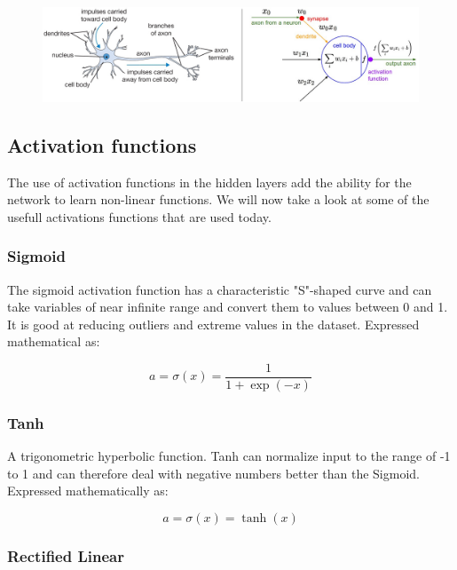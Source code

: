 \begin{figure}[H]
	\centering
	\includegraphics[width=\linewidth]{fig/artificial-neuron.png}
	\label{fig:artificial-neuron}
\end{figure}

\subsection{Activation functions}

The use of activation functions in the hidden layers add the ability for the network to learn non-linear functions. We will now take a look at some of the usefull activations functions that are used today.

\subsubsection*{Sigmoid}
The sigmoid activation function has a characteristic "S"-shaped curve and can take variables of near infinite range and convert them to values between 0 and 1. It is good at reducing outliers and extreme values in the dataset. Expressed mathematical as:

\begin{equation}
a = \sigma(x) = \frac{1}{1+\exp(-x)}
\end{equation}


\subsubsection*{Tanh}

A trigonometric hyperbolic function. Tanh can normalize input to the range of -1 to 1 and can therefore deal with negative numbers better than the Sigmoid. Expressed mathematically as:

\begin{equation}
a = \sigma(x) = \tanh(x)
\end{equation}


\subsubsection*{Rectified Linear}

